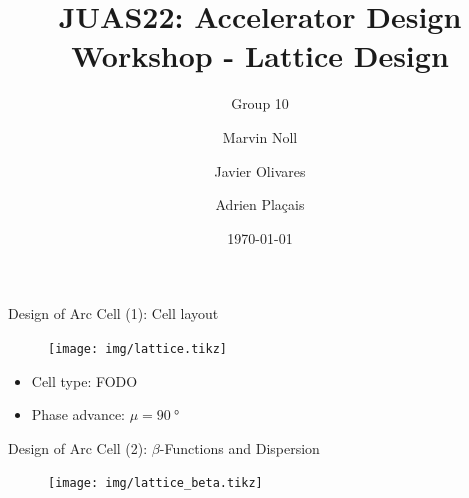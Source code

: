\documentclass{beamer}
\title[Topic III: Lattice Design]{JUAS22: Accelerator Design Workshop - Lattice Design}
\subtitle{Group 10}
\author[Noll, Olivares, Plaçais]{Marvin Noll \and Javier Olivares \and Adrien Plaçais}
\date[\today]{\today}
\begin{document}
\begin{frame}[plain]
  \titlepage
\end{frame}

\begin{frame}[t,fragile]{Design of Arc Cell (1): Cell layout}
\begin{figure}
\centering
\texttt{[image: img/lattice.tikz]}
\end{figure}
\begin{itemize}
\item Cell type: FODO
\item Phase advance: $\mu=\SI{90}{\degree}$
\end{itemize}
\end{frame}

%
\begin{frame}[t,fragile]{Design of Arc Cell (2): $\beta$-Functions and Dispersion}
\begin{figure}
\centering
\texttt{[image: img/lattice\_beta.tikz]}
\end{figure}
\end{frame}
%
%
\end{document}
